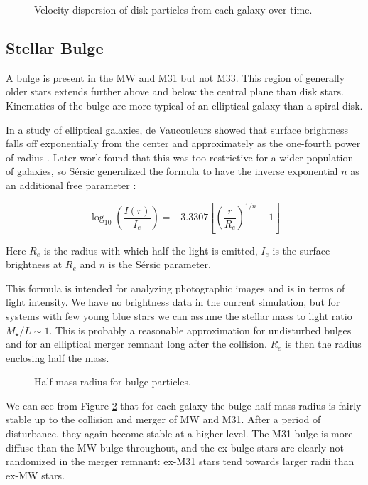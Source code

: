 \documentclass[twocolumn]{aastex63}
\newcommand{\todo}{\color{red}{TODO}\color{black}\hspace{2mm}}
\begin{document}
\begin{figure}[htb!]
	\caption{Velocity dispersion of disk particles from each galaxy over time.
		\label{fig:vel_disp}}
\end{figure}

\todo{disk rotation curve, $V_{rot}/\sigma$}

\subsection{Stellar Bulge}

A bulge is present in the MW and M31 but not M33. This region of generally older stars extends further above and below the central plane than disk stars. Kinematics of the bulge are more typical of an elliptical galaxy than a spiral disk.

In a study of elliptical galaxies, de Vaucouleurs showed that surface brightness falls off exponentially from the center and approximately as the one-fourth power of radius \citep{de_vaucouleurs_recherches_1948}. Later work found that this was too restrictive for a wider population of galaxies, so Sérsic generalized the formula to have the inverse exponential $n$ as an additional free parameter \citep{sersic_influence_1963}:

\[ \log_{10} \left( \frac{I(r)}{I_e} \right) =  -3.3307 \left[ \left( \frac{r}{R_e} \right)^{1/n} - 1 \right] \]

Here $R_e$ is the radius with which half the light is emitted,  $I_e$ is the surface brightness at $R_e$ and $n$ is the Sérsic parameter.

This formula is intended for analyzing photographic images and is in terms of light intensity. We have no brightness data in the current simulation, but for systems with few young blue stars we can assume the stellar mass to light ratio $M_\star/L \sim 1$. This is probably a reasonable approximation for undisturbed bulges and for an elliptical merger remnant long after the collision. $R_e$ is then the radius enclosing half the mass.

\begin{figure}[bht!]
	\caption{Half-mass radius for bulge particles.
		\label{fig:sersic_Re}}
\end{figure}

We can see from Figure \ref{fig:sersic_Re} that for each galaxy the bulge half-mass radius is fairly stable up to the collision and merger of MW and M31. After a period of disturbance, they again become stable at a higher level. The M31 bulge is more diffuse than the MW bulge throughout, and the ex-bulge stars are clearly not randomized in the merger remnant: ex-M31 stars tend towards larger radii than ex-MW stars.
\end{document}
